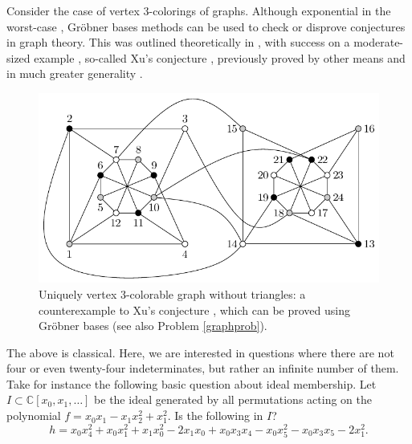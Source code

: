 Consider the case of vertex 3-colorings of graphs.  Although exponential in the worst-case \cite[pp. 400]{yap2000fundamental}, Gr\"obner bases methods can be used to check or disprove conjectures in graph theory.  This was outlined theoretically in \cite{bayer1982division}, with success on a moderate-sized example \cite{hillar2008algebraic}, so-called Xu's conjecture \cite{shaoji1990size}, previously proved by other means and in much greater generality \cite{akbari2001kr}.

\begin{figure}
\begin{center}
\includegraphics[width=.8 \linewidth]{akbarigraph.pdf}
\caption{Uniquely vertex 3-colorable graph without triangles: a counterexample \cite{akbari2001kr} to Xu's conjecture \cite{shaoji1990size}, which can be proved using Gr\"obner bases \cite{hillar2008algebraic} (see also Problem \ref{graphprob}).}\label{graph}
\end{center}
\end{figure}
\fi

The above is classical.  Here, we are interested  in questions where there are not four or even twenty-four indeterminates, but rather an infinite number of them.  Take for instance the following basic question about ideal membership.  Let $I \subset \mathbb C[x_0,x_1,\ldots]$ be the ideal generated by all permutations acting on the polynomial $f = x_0 x_1 - x_1 x_2^2 +x_1^2$.  Is the following in $I$?
\[ h = x_0 x_4^2 + x_0 x_1^2  +x_1 x_0^2 - 2 x_1 x_0 + x_0 x_3 x_4 - x_0 x_5^2 - x_0 x_3 x_5 - 2 x_1^2.\]

